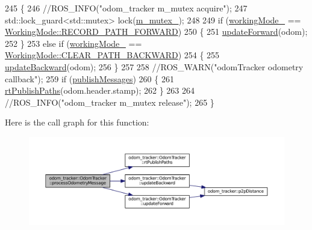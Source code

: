 \begin{DoxyCode}
245 \{
246     \textcolor{comment}{//ROS\_INFO("odom\_tracker m\_mutex acquire");}
247     std::lock\_guard<std::mutex> lock(\hyperlink{classodom__tracker_1_1OdomTracker_a17f1d82ae3d6441a4387af8fb83a3e20}{m\_mutex\_});
248 
249     \textcolor{keywordflow}{if} (\hyperlink{classodom__tracker_1_1OdomTracker_ab3b29200405d9a88cf3213656b14d7c0}{workingMode\_} == \hyperlink{namespaceodom__tracker_a4daf27fd157b1a481fdfd6f90de00b88a989d06a586bcf9520889228da7faa643}{WorkingMode::RECORD\_PATH\_FORWARD})
250     \{
251         \hyperlink{classodom__tracker_1_1OdomTracker_a248c89552c36c6df65a0d3b9aa58cce6}{updateForward}(odom);
252     \}
253     \textcolor{keywordflow}{else} \textcolor{keywordflow}{if} (\hyperlink{classodom__tracker_1_1OdomTracker_ab3b29200405d9a88cf3213656b14d7c0}{workingMode\_} == \hyperlink{namespaceodom__tracker_a4daf27fd157b1a481fdfd6f90de00b88a0cf8f27617189e35619df3c18bda6274}{WorkingMode::CLEAR\_PATH\_BACKWARD})
254     \{
255         \hyperlink{classodom__tracker_1_1OdomTracker_a30bb3d4a44600ce951a6be4f6583466c}{updateBackward}(odom);
256     \}
257 
258     \textcolor{comment}{//ROS\_WARN("odomTracker odometry callback");}
259     \textcolor{keywordflow}{if} (\hyperlink{classodom__tracker_1_1OdomTracker_a4d617a7bc17a7880a5ebee9697f827c0}{publishMessages})
260     \{
261         \hyperlink{classodom__tracker_1_1OdomTracker_ade06ab05e1853fbccd3702f88f0a42e5}{rtPublishPaths}(odom.header.stamp);
262     \}
263 
264     \textcolor{comment}{//ROS\_INFO("odom\_tracker m\_mutex release");}
265 \}
\end{DoxyCode}


Here is the call graph for this function\+:
\nopagebreak
\begin{figure}[H]
\begin{center}
\leavevmode
\includegraphics[width=350pt]{classodom__tracker_1_1OdomTracker_a90cf5e7b0de712b88e86966c29ab79ef_cgraph}
\end{center}
\end{figure}




